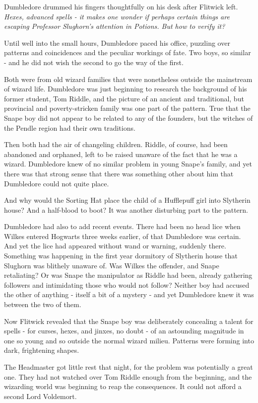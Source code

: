 Dumbledore drummed his fingers thoughtfully on his desk after Flitwick left. \emph{Hexes, advanced spells - it makes one wonder if perhaps certain things are escaping Professor Slughorn's attention in Potions. But how to verify it?}

Until well into the small hours, Dumbledore paced his office, puzzling over patterns and coincidences and the peculiar workings of fate. Two boys, so similar - and he did not wish the second to go the way of the first.

Both were from old wizard families that were nonetheless outside the mainstream of wizard life. Dumbledore was just beginning to research the background of his former student, Tom Riddle, and the picture of an ancient and traditional, but provincial and poverty-stricken family was one part of the pattern. True that the Snape boy did not appear to be related to any of the founders, but the witches of the Pendle region had their own traditions.

Then both had the air of changeling children. Riddle, of course, had been abandoned and orphaned, left to be raised unaware of the fact that he was a wizard. Dumbledore knew of no similar problem in young Snape's family, and yet there was that strong sense that there was something other about him that Dumbledore could not quite place.

And why would the Sorting Hat place the child of a Hufflepuff girl into Slytherin house? And a half-blood to boot? It was another disturbing part to the pattern.

Dumbledore had also to add recent events. There had been no head lice when Wilkes entered Hogwarts three weeks earlier, of that Dumbledore was certain. And yet the lice had appeared without wand or warning, suddenly there. Something was happening in the first year dormitory of Slytherin house that Slughorn was blithely unaware of. Was Wilkes the offender, and Snape retaliating? Or was Snape the manipulator as Riddle had been, already gathering followers and intimidating those who would not follow? Neither boy had accused the other of anything - itself a bit of a mystery - and yet Dumbledore knew it was between the two of them.

Now Flitwick revealed that the Snape boy was deliberately concealing a talent for spells - for curses, hexes, and jinxes, no doubt - of an astounding magnitude in one so young and so outside the normal wizard milieu. Patterns were forming into dark, frightening shapes.

The Headmaster got little rest that night, for the problem was potentially a great one. They had not watched over Tom Riddle enough from the beginning, and the wizarding world was beginning to reap the consequences. It could not afford a second Lord Voldemort.

